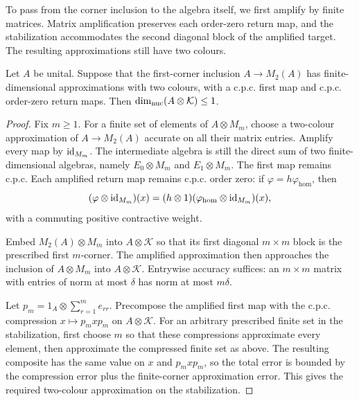 \begin{remark}
To pass from the corner inclusion to the algebra itself, we first
amplify by finite matrices.  Matrix amplification preserves each
order-zero return map, and the stabilization accommodates the second
diagonal block of the amplified target.  The resulting approximations
still have two colours.
\end{remark}

\begin{lemma}
\label{end:stabilize}
Let $A$ be unital. Suppose that the first-corner inclusion
$A\to M_2(A)$ has finite-dimensional approximations with two colours,
with a c.p.c. first map and c.p.c. order-zero return maps.
Then $\dim_{\mathrm{nuc}}(A\otimes\mathcal K)\le1$.
\end{lemma}

\begin{proof}
Fix $m\ge1$. For a finite set of elements of $A\otimes M_m$,
choose a two-colour approximation of $A\to M_2(A)$ accurate on
all their matrix entries. Amplify every map by $\mathrm{id}_{M_m}$.
The intermediate algebra is still the direct sum of two
finite-dimensional algebras, namely $E_0\otimes M_m$ and
$E_1\otimes M_m$. The first map remains c.p.c. Each amplified
return map remains c.p.c. order zero: if $\varphi=h\varphi_{\mathrm{hom}}$,
then
\[
 (\varphi\otimes\mathrm{id}_{M_m})(x)
 =(h\otimes1)(\varphi_{\mathrm{hom}}\otimes\mathrm{id}_{M_m})(x),
\]
with a commuting positive contractive weight.

Embed $M_2(A)\otimes M_m$ into $A\otimes\mathcal K$ so that its
first diagonal $m\times m$ block is the prescribed first $m$-corner.
The amplified approximation then approaches the inclusion of
$A\otimes M_m$ into $A\otimes\mathcal K$. Entrywise accuracy
suffices: an $m\times m$ matrix with entries of norm at most $\delta$
has norm at most $m\delta$.

Let $p_m=1_A\otimes\sum_{r=1}^m e_{rr}$. Precompose the amplified
first map with the c.p.c. compression $x\mapsto p_mxp_m$ on
$A\otimes\mathcal K$. For an arbitrary prescribed finite set in
the stabilization, first choose $m$ so that these compressions
approximate every element, then approximate the compressed finite
set as above. The resulting composite has the same value on
$x$ and $p_mxp_m$, so the total error is bounded by the compression
error plus the finite-corner approximation error. This gives the
required two-colour approximation on the stabilization.
\end{proof}

